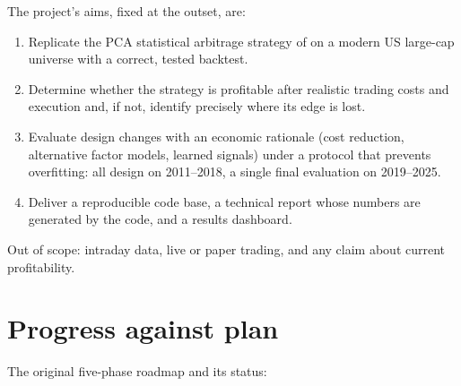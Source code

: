 \documentclass[11pt,a4paper]{article}
\begin{document}
The project's aims, fixed at the outset, are:
\begin{enumerate}
  \item Replicate the PCA statistical arbitrage strategy of \citet{avellaneda2010} on a modern
        US large-cap universe with a correct, tested backtest.
  \item Determine whether the strategy is profitable after realistic trading costs and execution
        and, if not, identify precisely where its edge is lost.
  \item Evaluate design changes with an economic rationale (cost reduction, alternative factor
        models, learned signals) under a protocol that prevents overfitting: all design on
        2011--2018, a single final evaluation on 2019--2025.
  \item Deliver a reproducible code base, a technical report whose numbers are generated by the
        code, and a results dashboard.
\end{enumerate}

Out of scope: intraday data, live or paper trading, and any claim about current profitability.

\section{Progress against plan}
\label{sec:progress}

The original five-phase roadmap and its status:
\end{document}

